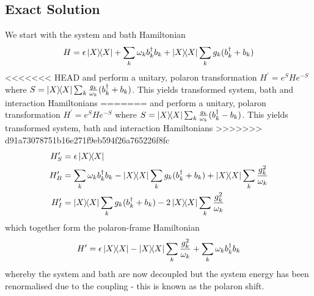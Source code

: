 \documentclass[]{article}
\begin{document}
\begin{itemize}
\begin{itemize}
\section{Exact Solution}
We start with the system and bath Hamiltonian
\begin{equation}
H = \epsilon\dyad{X} + \sum_{k}\omega_k b_k^{\dagger} b_k + \dyad{X}\sum_{k}g_k (b_k^{\dagger}+b_k)
\end{equation}
<<<<<<< HEAD
and perform a unitary, polaron transformation $H^{\prime} = e^{S}He^{-S}$ where $S= \dyad{X}\sum_{k}\frac{g_k}{\omega_k}(b_k^{\dagger}+b_k)$. This yields transformed system, bath and interaction Hamiltonians
=======
and perform a unitary, polaron transformation $H^{\prime} = e^{S}He^{-S}$ where $S= \dyad{X}\sum_{k}\frac{g_k}{\omega_k}(b_k^{\dagger}-b_k)$. This yields transformed system, bath and interaction Hamiltonians
>>>>>>> d91a73078751b16e271f9eb594f26a765226f8fc
\begin{align}
H_S^{\prime} &= \epsilon\dyad{X} \\
H_B^{\prime} &= \sum_{k}\omega_k b_k^{\dagger}b_k - \dyad{X}\sum_{k}g_k (b_k^{\dagger}+b_k) +\dyad{X}\sum_{k}\frac{g^2_k}{\omega_k} \\
H_I^{\prime} &= \dyad{X}\sum_{k}g_k (b_k^{\dagger}+b_k) - 2\dyad{X}\sum_{k}\frac{g^2_k}{\omega_k} \\
\end{align}
which together form the polaron-frame Hamiltonian
\begin{equation}
H^{\prime} = \epsilon\dyad{X} - \dyad{X}\sum_{k}\frac{g^2_k}{\omega_k} + \sum_{k}\omega_k b_k^{\dagger}b_k
\end{equation}
whereby the system and bath are now decoupled but the system energy has been renormalised due to the coupling - this is known as the polaron shift.


\end{itemize}
\end{itemize}
\end{document}
